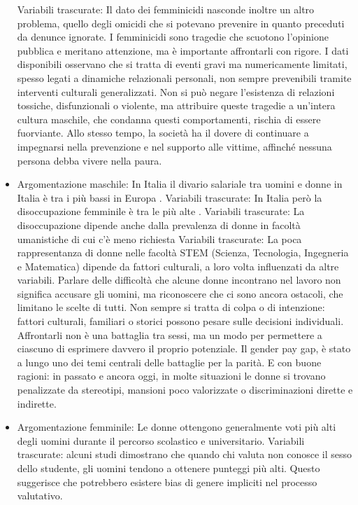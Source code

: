 \documentclass[12pt]{book} %
\begin{document}
\begin{mdframed}[linewidth=1pt]
\begin{itemize}
Variabili trascurate: Il dato dei femminicidi nasconde inoltre un altro problema, quello degli omicidi che si potevano prevenire in quanto preceduti da denunce ignorate. I femminicidi sono tragedie che scuotono l’opinione pubblica e meritano attenzione, ma è importante affrontarli con rigore. I dati disponibili osservano che si tratta di eventi gravi ma numericamente limitati, spesso legati a dinamiche relazionali personali, non sempre prevenibili tramite interventi culturali generalizzati.
Non si può negare l’esistenza di relazioni tossiche, disfunzionali o violente, ma attribuire queste tragedie a un’intera cultura maschile, che condanna questi comportamenti, rischia di essere fuorviante. Allo stesso tempo, la società ha il dovere di continuare a impegnarsi nella prevenzione e nel supporto alle vittime, affinché nessuna persona debba vivere nella paura.
\item Argomentazione maschile: In Italia il divario salariale tra uomini e donne in Italia è tra i più bassi in Europa .
Variabili trascurate: In Italia però la disoccupazione femminile è tra le più alte .
Variabili trascurate: La disoccupazione dipende anche dalla prevalenza di donne in facoltà umanistiche di cui c'è meno richiesta
Variabili trascurate: La poca rappresentanza di donne nelle facoltà STEM (Scienza, Tecnologia, Ingegneria e Matematica) dipende da fattori culturali, a loro volta influenzati da altre variabili.
Parlare delle difficoltà che alcune donne incontrano nel lavoro non significa accusare gli uomini, ma riconoscere che ci sono ancora ostacoli, che limitano le scelte di tutti. Non sempre si tratta di colpa o di intenzione: fattori culturali, familiari o storici possono pesare sulle decisioni individuali. Affrontarli non è una battaglia tra sessi, ma un modo per permettere a ciascuno di esprimere davvero il proprio potenziale.
Il gender pay gap, è stato a lungo uno dei temi centrali delle battaglie per la parità. E con buone ragioni: in passato e ancora oggi, in molte situazioni le donne si trovano penalizzate da stereotipi, mansioni poco valorizzate o discriminazioni dirette e indirette.
\item Argomentazione femminile: Le donne ottengono generalmente voti più alti degli uomini durante il percorso scolastico e universitario. 
Variabili trascurate: alcuni studi dimostrano che quando chi valuta non conosce il sesso dello studente, gli uomini tendono a ottenere punteggi più alti. Questo suggerisce che potrebbero esistere bias di genere impliciti nel processo valutativo.

\end{itemize}
\end{mdframed}
\end{document}
